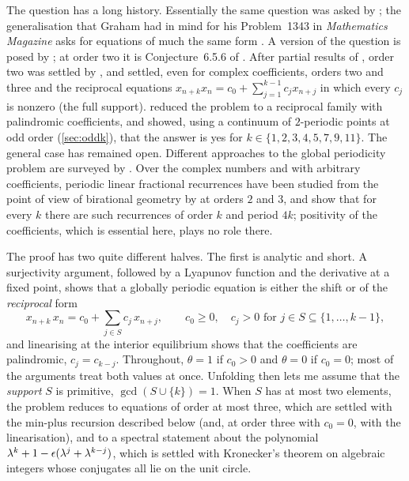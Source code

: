 The question has a long history. Essentially the same question was asked by
\citet[Research problem~1.24]{GrahamKnuthPatashnik1989}; the generalisation that
Graham had in mind for his Problem~1343 in \emph{Mathematics Magazine} asks for
equations of much the same form \citep[Remark~1]{KocicLadasRodrigues1993}. A version of the
question is posed by \citet[p.~161]{GroveLadas2005}; at order two it is Conjecture~6.5.6 of
\citet{KulenovicLadas2000}. After partial results of
\citet{KocicLadasRodrigues1993}, order two was settled by
\citet{BarbeauGelbordTanny1995}, and \citet{CsornyeiLaczkovich2001} settled,
even for complex coefficients, orders two and three and the reciprocal
equations $x_{n+k}x_n=c_0+\sum_{j=1}^{k-1}c_jx_{n+j}$ in which every $c_j$
is nonzero (the full support). \citet{CimaGasullManosas2004} reduced the
problem to a reciprocal family with palindromic coefficients, and showed,
using a continuum of $2$-periodic points at odd order (\autoref{sec:oddk}),
that the answer is yes for $k\in\{1,2,3,4,5,7,9,11\}$. The general case has
remained open. Different approaches to
the global periodicity problem are surveyed by
\citet{CimaGasullManosaManosas2016}.
Over the complex numbers and with arbitrary coefficients, periodic linear
fractional recurrences have been studied from the point of view of
birational geometry by \citet{BedfordKim2006,BedfordKim2014} at orders $2$
and $3$, and \citet{BedfordKim2011} show that for every $k$ there are
such recurrences of order $k$ and period $4k$;
positivity of the coefficients, which is essential here, plays no role
there.

The proof has two quite different halves. The first is analytic and
short. A surjectivity argument, followed by a Lyapunov function and the
derivative at a fixed point, shows that a globally periodic equation is
either the shift or of the \emph{reciprocal} form
\begin{equation}
x_{n+k}\,x_n = c_0 + \sum_{j\in S} c_j\,x_{n+j},
\qquad c_0\ge0,\quad c_j > 0 \text{ for } j \in S \subseteq \{1,\dots,k-1\},
\end{equation}
and linearising at the interior equilibrium shows that the coefficients
are palindromic, $c_j=c_{k-j}$. Throughout, $\theta=1$ if $c_0>0$ and
$\theta=0$ if $c_0=0$; most of the arguments treat both values at once. Unfolding then lets me assume that the
\emph{support} $S$ is primitive, $\gcd(S\cup\{k\})=1$. When $S$ has at
most two elements, the problem reduces to equations of order at most
three, which are settled with the min-plus recursion described below
(and, at order three with $c_0=0$, with the linearisation), and to a spectral statement about the
polynomial $\lambda^k+1-\epsilon(\lambda^j+\lambda^{k-j})$, which is settled
with Kronecker's theorem on algebraic integers whose conjugates all lie
on the unit circle.

